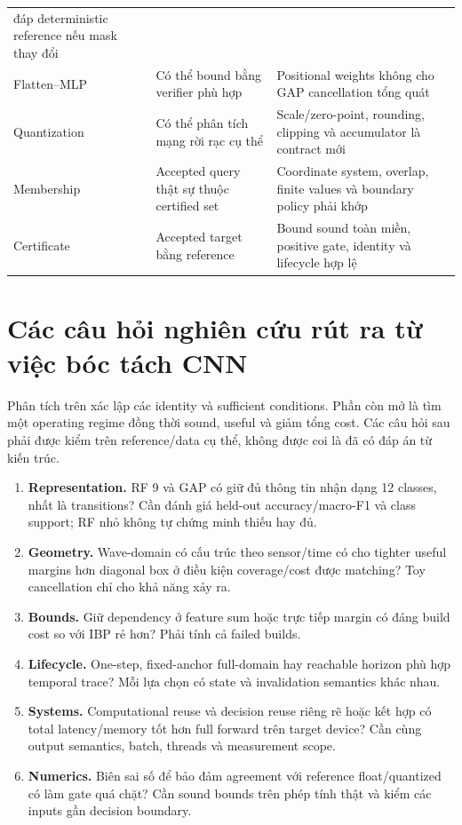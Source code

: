 \documentclass[11pt,a4paper]{article}
\theoremstyle{definition}
\begin{document}
\begin{longtable}{@{}P{3cm}P{5.65cm}P{6.15cm}@{}}
đáp deterministic reference nếu mask thay đổi\\
Flatten--MLP & Có thể bound bằng verifier phù hợp & Positional weights
không cho GAP cancellation tổng quát\\
Quantization & Có thể phân tích mạng rời rạc cụ thể & Scale/zero-point,
rounding, clipping và accumulator là contract mới\\
Membership & Accepted query thật sự thuộc certified set & Coordinate
system, overlap, finite values và boundary policy phải khớp\\
Certificate & Accepted target bằng reference & Bound sound toàn miền,
positive gate, identity và lifecycle hợp lệ\\\bottomrule
\end{longtable}

\section{Các câu hỏi nghiên cứu rút ra từ việc bóc tách CNN}
Phân tích trên xác lập các identity và sufficient conditions. Phần còn
mở là tìm một operating regime đồng thời sound, useful và giảm tổng
cost. Các câu hỏi sau phải được kiểm trên reference/data cụ thể, không
được coi là đã có đáp án từ kiến trúc.

\begin{enumerate}
\item \textbf{Representation.} RF 9 và GAP có giữ đủ thông tin nhận dạng
12 classes, nhất là transitions? Cần đánh giá held-out accuracy/macro-F1
và class support; RF nhỏ không tự chứng minh thiếu hay đủ.
\item \textbf{Geometry.} Wave-domain có cấu trúc theo sensor/time có
cho tighter useful margins hơn diagonal box ở điều kiện coverage/cost
được matching? Toy cancellation chỉ cho khả năng xảy ra.
\item \textbf{Bounds.} Giữ dependency ở feature sum hoặc trực tiếp margin
có đáng build cost so với IBP rẻ hơn? Phải tính cả failed builds.
\item \textbf{Lifecycle.} One-step, fixed-anchor full-domain hay reachable
horizon phù hợp temporal trace? Mỗi lựa chọn có state và invalidation
semantics khác nhau.
\item \textbf{Systems.} Computational reuse và decision reuse riêng rẽ
hoặc kết hợp có total latency/memory tốt hơn full forward trên target
device? Cần cùng output semantics, batch, threads và measurement scope.
\item \textbf{Numerics.} Biên sai số để bảo đảm agreement với reference
float/quantized có làm gate quá chặt? Cần sound bounds trên phép tính
thật và kiểm các inputs gần decision boundary.
\end{enumerate}
\end{document}
